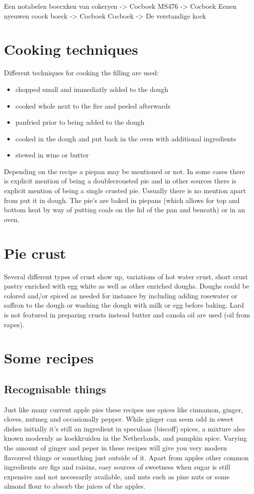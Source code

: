 \documentclass[a4paper]{article}
\begin{document}
Een notabelen boecxken van cokeryen ->  Cocboek
MS476 -> Cocboek
Eenen nyeuwen coock boeck -> Cocboek
Cocboek -> De verstandige kock

\section{Cooking techniques}
Different techniques for cooking the filling are used:
\begin{itemize}
    \item chopped small and immediatly added to the dough
    \item cooked whole next to the fire and peeled afterwards
    \item panfried prior to being added to the dough
    \item cooked in the dough and put back in the oven with additional ingredients
    \item stewed in wine or butter
\end{itemize}

Depending on the recipe a piepan may be mentioned or not. In some cases there is explicit mention of being a doublecrousted pie and in other sources there is explicit mention of being a single crusted pie. Ussually there is no mention apart from put it in dough. The pie's are baked in piepans (which allows for top and bottom heat by way of putting coals on the lid of the pan and beneath) or in an oven.

\section{Pie crust} 
Several different types of crust show up, variations of hot water crust, short crust pastry enriched with egg white as well as other enriched doughs. Doughs could be colored and/or spiced as needed for instance by including adding rosewater or saffron to the dough or washing the dough with milk or egg before baking. Lard is not featured in preparing crusts instead butter and canola oil are used (oil from rapes).


\section{Some recipes}






\subsection{Recognisable things}
Just like many current apple pies these recipes use spices like cinnamon, ginger, cloves, nutmeg and occasionally pepper. While ginger can seem odd in sweet dishes initially it’s still an ingredient in speculaas (biscoff) spices, a mixture also known modernly as koekkruiden in the Netherlands, and pumpkin spice. Varying the amount of ginger and peper in these recipes will give you very modern flavoured things or something just outside of it.
Apart from apples other common ingredients are figs and raisins, easy sources of sweetness when sugar is still expensive and not necessarily available, and nuts such as pine nuts or some almond flour to absorb the juices of the apples.
\end{document}

